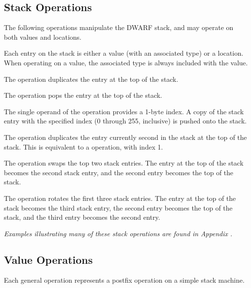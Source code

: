 \subsection{Stack Operations}
\label{chap:stackoperations}
The following 
operations manipulate the DWARF stack, and may operate on both values
and locations.

Each entry on the stack is either a value (with an associated type) or
a location. When operating on a value, the associated type is always
included with the value.

\begin{enumerate}[1. ]
\itembfnl{\DWOPdupTARG}
The \DWOPdupNAME{} operation duplicates the entry at the top of the
stack.

\itembfnl{\DWOPdropTARG}
The \DWOPdropNAME{} operation pops the entry at the top of the stack.

\itembfnl{\DWOPpickTARG}
The single operand of the \DWOPpickNAME{} operation provides a 1-byte
index. A copy of the stack entry with the specified index (0 through
255, inclusive) is pushed onto the stack.

\itembfnl{\DWOPoverTARG}
The \DWOPoverNAME{} operation duplicates the entry currently second in
the stack at the top of the stack.  This is equivalent to a
\DWOPpick{} operation, with index 1.

\itembfnl{\DWOPswapTARG}
The \DWOPswapNAME{} operation swaps the top two stack entries.  The
entry at the top of the stack becomes the second stack entry, and the
second entry becomes the top of the stack.

\itembfnl{\DWOProtTARG}
The \DWOProtNAME{} operation rotates the first three stack
entries. The entry at the top of the stack becomes the third stack
entry, the second entry becomes the top of the stack, and the third
entry becomes the second entry.
\end{enumerate}

\textit{Examples illustrating many of these stack operations are
found in Appendix .}


\subsection{Value Operations}
\label{chap:valueoperations}
Each general operation represents a postfix operation on
a simple stack machine.

